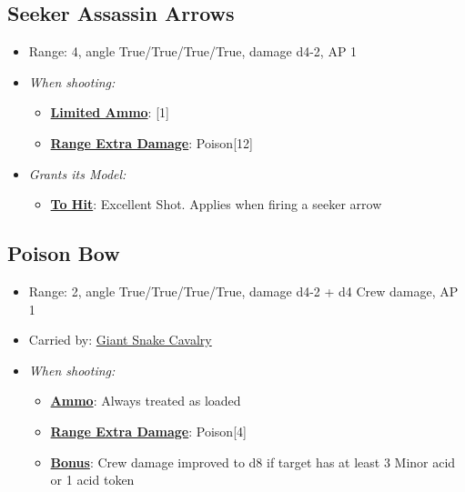 \documentclass[a4paper,12pt]{article}
\begin{document}
\subsection{Seeker Assassin Arrows}
\label{equipment-seeker-assassin-arrows-free}

\begin{itemize}
\item Range: 4, angle True/True/True/True, damage d4-2, AP 1
\item \textit{When shooting:}
\begin{itemize}
\item \textbf{\hyperref[rule-special-limited-ammo]{Limited Ammo}}: [1]
\item \textbf{\hyperref[rule-special-range-extra-damage]{Range Extra Damage}}: Poison[12]

\end{itemize}





\item \textit{Grants its Model:}
\begin{itemize}
\item \textbf{\hyperref[rule-special-to-hit]{To Hit}}: Excellent Shot. Applies when firing a seeker arrow

\end{itemize}

\end{itemize}

\subsection{Poison Bow}
\label{equipment-poison-bow-free}

\begin{itemize}
\item Range: 2, angle True/True/True/True, damage d4-2 + d4 Crew damage, AP 1
\item Carried by: \hyperref[model-giant-snake-cavalry]{Giant Snake Cavalry}
\item \textit{When shooting:}
\begin{itemize}
\item \textbf{\hyperref[rule-special-ammo]{Ammo}}: Always treated as loaded
\item \textbf{\hyperref[rule-special-range-extra-damage]{Range Extra Damage}}: Poison[4]
\item \textbf{\hyperref[rule-special-bonus]{Bonus}}: Crew damage improved to d8 if target has at least 3 Minor acid or 1 acid token

\end{itemize}






\end{itemize}
\end{document}
